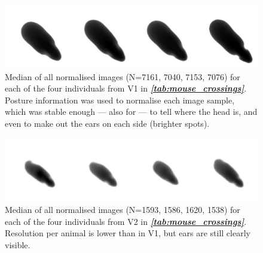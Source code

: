 \documentclass[9pt,lineno]{elife}
\newcommand{\tableref}[1]{\textit{\textbf{\ref{tab:#1}}}\xspace}
\newcommand{\TRex}{\protect\path{TRex}}
\begin{document}
\begin{figure}
\begin{fullwidth}
\includegraphics[width=1.0\linewidth]{figures/mice_image.pdf}
\caption{{\color{blue}Median of all normalised images (N=7161, 7040, 7153, 7076) for each of the four individuals from V1 in \tableref{mouse_crossings}. Posture information was used to normalise each image sample, which was stable enough — also for \TRex{} — to tell where the head is, and even to make out the ears on each side (brighter spots).}}
\label{fig:mice_image}
\end{fullwidth}
\end{figure}

\begin{figure}
\begin{fullwidth}
\includegraphics[width=1.0\linewidth]{figures/mice_camera_image.pdf}
\caption{{\color{blue}Median of all normalised images (N=1593, 1586, 1620, 1538) for each of the four individuals from V2 in \tableref{mouse_crossings}. Resolution per animal is lower than in V1, but ears are still clearly visible.}}
\label{fig:mice_camera_image}
\end{fullwidth}
\end{figure}
\end{document}
